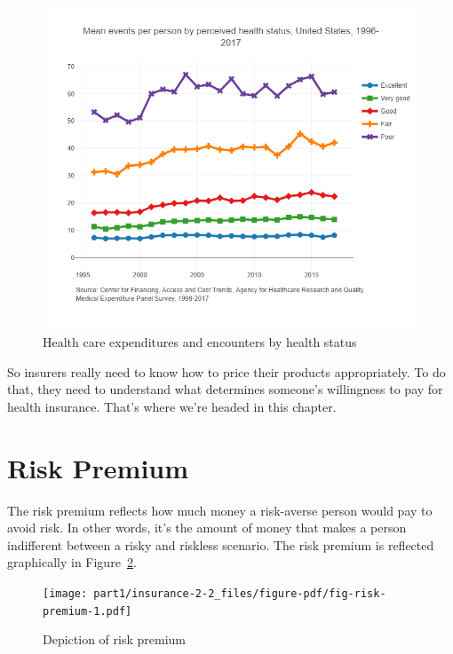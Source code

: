 \documentclass[
  letterpaper,
  DIV=11,
  numbers=noendperiod]{scrreport}
\theoremstyle{definition}
\theoremstyle{remark}
\begin{document}
\begin{figure}
\begin{minipage}[t]{0.50\linewidth}
{{\includegraphics{part1/../figures/meps-visits.png}

}

}

\end{minipage}%

\caption{\label{fig-meps}Health care expenditures and encounters by
health status}

\end{figure}

So insurers really need to know how to price their products
appropriately. To do that, they need to understand what determines
someone's willingness to pay for health insurance. That's where we're
headed in this chapter.

\hypertarget{sec-riskpremium}{%
\section{Risk Premium}\label{sec-riskpremium}}

The risk premium reflects how much money a risk-averse person would pay
to avoid risk. In other words, it's the amount of money that makes a
person indifferent between a risky and riskless scenario. The risk
premium is reflected graphically in Figure~\ref{fig-risk-premium}.

\begin{figure}

{\centering \texttt{[image: part1/insurance-2-2\_files/figure-pdf/fig-risk-premium-1.pdf]}

}

\caption{\label{fig-risk-premium}Depiction of risk premium}

\end{figure}
\end{document}
